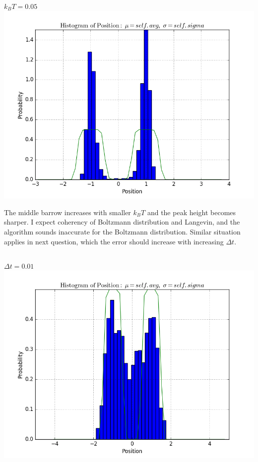 \documentclass[11pt, oneside]{article}   	%
\begin{document}
\paragraph{}
$k_B T = 0.05$
\includegraphics[scale = 0.5]{hist5.png}

The middle barrow increases with smaller $k_B T$ and the peak height becomes sharper. I expect coherency of Boltzmann distribution and Langevin, and the algorithm sounds inaccurate for the Boltzmann distribution. Similar situation applies in next question, which the error should increase with increasing $\Delta t$.

\subsection{}
\paragraph{}
$\Delta t = 0.01$
\includegraphics[scale = 0.5]{dt1.png}
\end{document}
